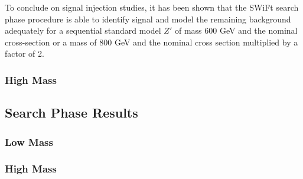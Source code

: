 To conclude on signal injection studies, it has been shown that the SWiFt search phase procedure
is able to identify signal and model the remaining background adequately
for a sequential standard model $Z'$ of mass 600 GeV and the nominal cross-section
or a mass of 800 GeV and the nominal cross section multiplied by a factor of 2.

\subsubsection{High Mass}
\label{sec:highmass_signalInj}

\subsection{Search Phase Results}
\label{sec:bkg-full_results}

\subsubsection{Low Mass}
\label{sec:bkg-lowmass_results}

\subsubsection{High Mass}
\label{sec:bkg-highmass_results}
